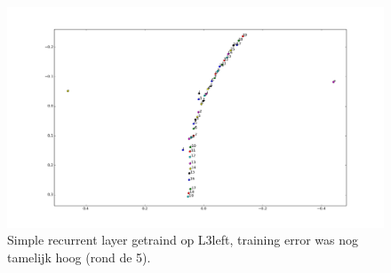 \documentclass{article}
\begin{document}
\begin{figure}[!ht]
    \includegraphics[scale=0.5]{SRN_L3left.png}
    \caption{Simple recurrent layer getraind op L3left, training error was nog tamelijk hoog (rond de 5).}
\end{figure}
\end{document}
